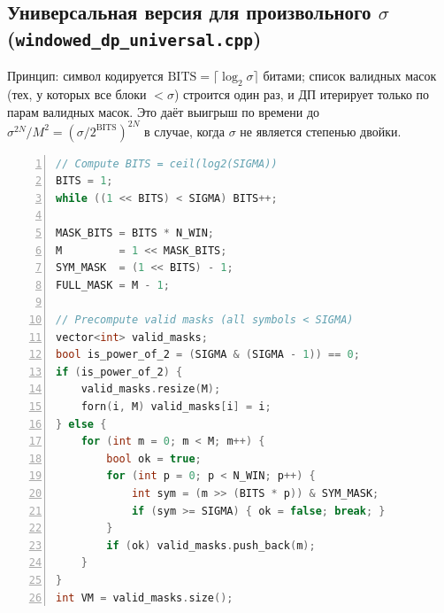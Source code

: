 \subsection*{Универсальная версия для произвольного $\sigma$ (\texttt{windowed\_dp\_universal.cpp})}

Принцип: символ кодируется $\mathrm{BITS} = \lceil \log_2 \sigma \rceil$ битами; список валидных масок (тех, у которых все блоки $<\sigma$) строится один раз, и ДП итерирует только по парам валидных масок. Это даёт выигрыш по времени до $\sigma^{2N}/M^2 = (\sigma/2^{\mathrm{BITS}})^{2N}$ в случае, когда $\sigma$ не является степенью двойки.

\begin{lstlisting}[language=c++,basicstyle=\footnotesize\ttfamily,numbers=left,caption={Универсальная версия: предвычисление валидных масок (дословно из файла \texttt{src/windowed\_dp\_universal.cpp} репозитория~\cite{ourgithub})},label={lst:wdp-universal-masks}]
// Compute BITS = ceil(log2(SIGMA))
BITS = 1;
while ((1 << BITS) < SIGMA) BITS++;

MASK_BITS = BITS * N_WIN;
M         = 1 << MASK_BITS;
SYM_MASK  = (1 << BITS) - 1;
FULL_MASK = M - 1;

// Precompute valid masks (all symbols < SIGMA)
vector<int> valid_masks;
bool is_power_of_2 = (SIGMA & (SIGMA - 1)) == 0;
if (is_power_of_2) {
    valid_masks.resize(M);
    forn(i, M) valid_masks[i] = i;
} else {
    for (int m = 0; m < M; m++) {
        bool ok = true;
        for (int p = 0; p < N_WIN; p++) {
            int sym = (m >> (BITS * p)) & SYM_MASK;
            if (sym >= SIGMA) { ok = false; break; }
        }
        if (ok) valid_masks.push_back(m);
    }
}
int VM = valid_masks.size();
\end{lstlisting}


